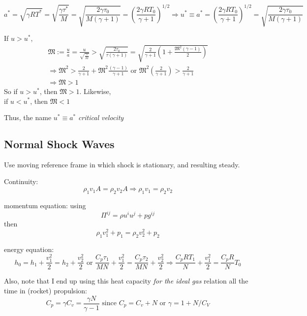 \documentclass[twoside,landscape,10pt]{amsart}
\theoremstyle{plain}
\theoremstyle{definition}
\theoremstyle{remark}
\theoremstyle{remark}
\begin{document}
\begin{multicols*}{2}
\begin{equation}\label{Eq:criticalvelocity}
a^* = \sqrt{ \gamma R T^*} = \sqrt{ \frac{\gamma \tau^* }{M} } = \sqrt{ \frac{2\gamma \tau_0 }{ M(\gamma + 1 ) } } = \left( \frac{2\gamma R T_0 }{\gamma + 1 } \right)^{1/2} \Longrightarrow u^* \equiv a^*  = \left( \frac{2\gamma RT_0 }{ \gamma + 1 } \right)^{1/2} = \sqrt{ \frac{2\gamma \tau_0}{M(\gamma +1) } }
\end{equation}

If $u > u^*$, 
\[
\begin{gathered}
  \mathfrak{M} := \frac{u}{a} = \frac{u}{ \sqrt{ \frac{ \gamma \tau }{ M } } } > \sqrt{ \frac{ 2\tau_0}{ \tau (\gamma + 1 ) } } = \sqrt{ \frac{2}{\gamma +1 } (1 + \frac{ \mathfrak{M}^2(\gamma - 1) }{2}  ) } \\ 
  \Longrightarrow \mathfrak{M}^2 > \frac{2}{\gamma +1 } + \mathfrak{M}^2 \frac{ (\gamma - 1) }{ \gamma + 1 } \text{ or } \mathfrak{M}^2 \left( \frac{2}{\gamma + 1} \right) > \frac{2}{\gamma +1 } \\
  \Longrightarrow \mathfrak{M} > 1
\end{gathered}
\]
So if $u > u^*$, then $\mathfrak{M}>1$.  Likewise, \\
\phantom{So } if $u < u^*$, then $\mathfrak{M}<1$

Thus, the name $u^*\equiv a^*$ \emph{critical velocity}

\subsection{Normal Shock Waves}

Use moving reference frame in which shock is stationary, and resulting steady.




Continuity:
\[
\rho_1 v_1 A = \rho_2 v_2 A \Longrightarrow \rho_1 v_1 = \rho_2 v_2 
\]

momentum equation: using
\[
\Pi^{ij} = \rho u^i u^j + p g^{ij}
\]
then
\[
\rho_1 v_1^2 + p_1 = \rho_2 v_2^2 + p_2 
\]

energy equation:
\[
h_0 = h_1 + \frac{v_1^2}{2} = h_2 + \frac{v_2^2}{2} \text{ or } \frac{C_p \tau_1}{MN} + \frac{v_1^2}{2} = \frac{C_p\tau_2}{MN} + \frac{v_2^2}{2} \Longrightarrow \frac{C_p R T_1}{N} + \frac{v_1^2}{2} = \frac{C_pR}{N} T_0
\]

Also, note that I end up using this heat capacity \emph{ for the ideal gas } relation all the time in (rocket) propulsion:
\[
C_p = \gamma C_v = \frac{\gamma N}{\gamma -1}  \text{ since } C_p = C_v + N \text{ or } \gamma = 1 + N/C_V
\]


\end{multicols*}
\end{document}

